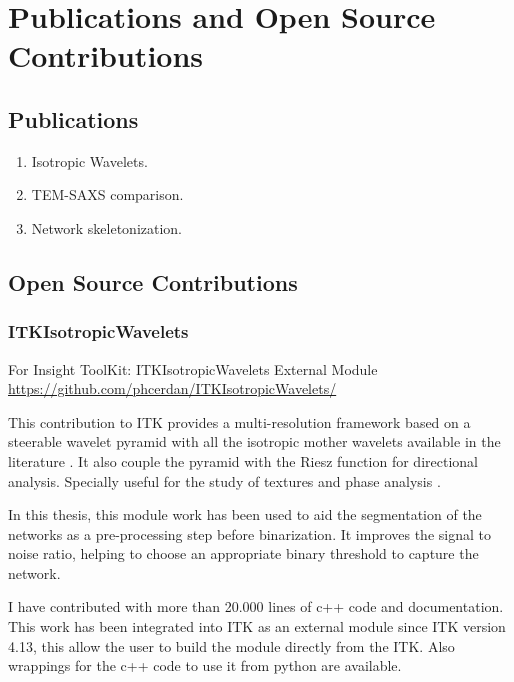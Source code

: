 \chapter{Publications and Open Source Contributions}

\label{Appendix-Contributions}


\section{Publications}

\begin{enumerate}[label=\bfseries\alph*)]
\item Isotropic Wavelets.
\item TEM-SAXS comparison.
\item Network skeletonization.
\end{enumerate}

\section{Open Source Contributions}%
\label{sec:contributions}

\subsection{ITKIsotropicWavelets}%
\label{sub:contribution_itk}
For Insight ToolKit: ITKIsotropicWavelets External Module \url{https://github.com/phcerdan/ITKIsotropicWavelets/}

  This contribution to ITK provides a multi-resolution framework based on a steerable wavelet pyramid \cite{simoncelli_steerable_1995} with all the isotropic mother wavelets available in the literature \cite{held_steerable_2010, pad_vow:_2014}. It also couple the pyramid with the Riesz function \cite{chenouard_3d_2012} for directional analysis. Specially useful for the study of textures \cite{depeursinge_steerable_2017} and phase analysis \cite{held_steerable_2010}.

In this thesis, this module work has been used to aid the segmentation of the networks as a pre-processing step before binarization. It improves the signal to noise ratio, helping to choose an appropriate binary threshold to capture the network.

I have contributed with more than 20.000 lines of c++ code and documentation. This work has been
integrated into ITK as an external module since ITK version 4.13, this allow the user to build the module directly from the ITK.
Also wrappings for the c++ code to use it from python are available.

